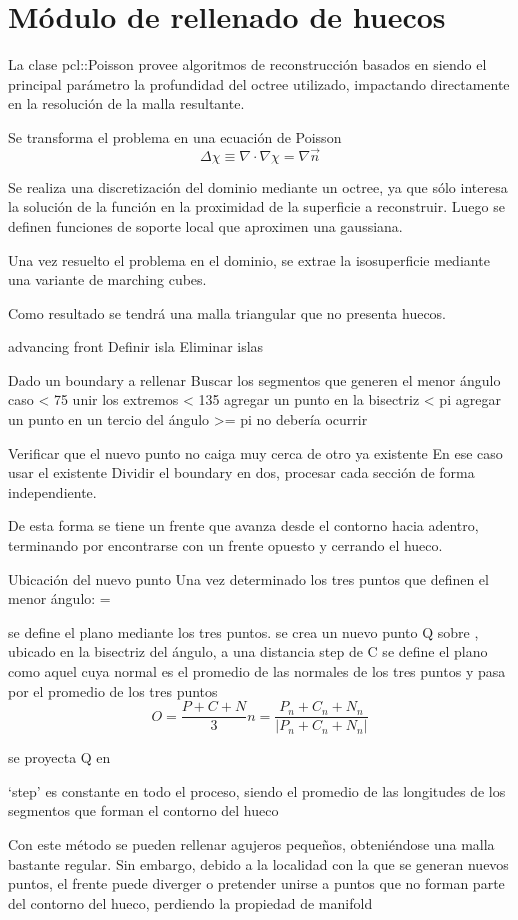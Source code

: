 \chapter{Módulo de rellenado de huecos}
	La clase pcl::Poisson provee algoritmos de reconstrucción basados en %
	siendo el principal parámetro la profundidad del octree utilizado,
	impactando directamente en la resolución de la malla resultante.


	Se transforma el problema en una ecuación de Poisson
	\[\Delta\chi \equiv \nabla \cdot\nabla\chi = \nabla \vec{n}\]

	Se realiza una discretización del dominio mediante un octree, ya que sólo
	interesa la solución de la función en la proximidad de la superficie a
	reconstruir.
	Luego se definen funciones de soporte local que aproximen una gaussiana.

	Una vez resuelto el problema en el dominio, se extrae la isosuperficie mediante una variante de marching cubes.

	Como resultado se tendrá una malla triangular que no presenta huecos.


	advancing front
	Definir isla
	Eliminar islas

	Dado un boundary a rellenar
		Buscar los segmentos que generen el menor ángulo
		caso \alpha < 75
			unir los extremos
		\alpha < 135
			agregar un punto en la bisectriz
		\alpha < pi
			agregar un punto en un tercio del ángulo
		\alpha >= pi
			no debería ocurrir

		Verificar que el nuevo punto no caiga muy cerca de otro ya existente
		En ese caso usar el existente
			Dividir el boundary en dos, procesar cada sección de forma independiente.

		De esta forma se tiene un frente que avanza desde el contorno hacia adentro, terminando por encontrarse con un frente opuesto y cerrando el hueco.


	Ubicación del nuevo punto
		Una vez determinado los tres puntos que definen el menor ángulo: 
			\theta = 

		se define el plano \alpha mediante los tres puntos.
		se crea un nuevo punto Q sobre \alpha, ubicado en la bisectriz del ángulo, a una distancia step de C
		se define el plano \beta como aquel cuya normal es el promedio de las normales de los tres puntos y pasa por el promedio de los tres puntos
		\[
		O = \frac{P+C+N}{3}
		n = \frac{P_n + C_n + N_n} {|P_n + C_n + N_n|}
		\]

		se proyecta Q en \beta

		`step' es constante en todo el proceso, siendo el promedio de las longitudes de los segmentos que forman el contorno del hueco


		Con este método se pueden rellenar agujeros pequeños, obteniéndose una malla bastante regular.
		Sin embargo, debido a la localidad con la que se generan nuevos puntos, el frente puede diverger o pretender unirse a puntos que no forman parte del contorno del hueco, perdiendo la propiedad de manifold

